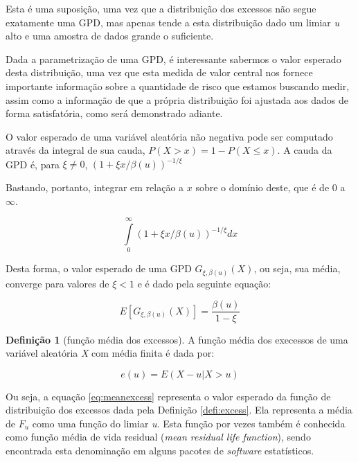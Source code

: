 \documentclass[review]{elsarticle}
\theoremstyle{definition}
\newtheorem{defi}[teor]{Definição}
\begin{document}
Esta é uma suposição, uma vez que a distribuição dos excessos não segue exatamente uma GPD, mas apenas tende a esta distribuição dado um limiar \emph{u} alto e uma amostra de dados grande o suficiente.

Dada a parametrização de uma GPD, é interessante sabermos o valor esperado desta distribuição, uma vez que esta medida de valor central nos fornece importante informação sobre a quantidade de risco que estamos buscando medir, assim como a informação de que a própria distribuição foi ajustada aos dados de forma satisfatória, como será demonstrado adiante.

O valor esperado de uma variável aleatória não negativa pode ser computado através da integral de sua cauda, $P(X>x) = 1-P(X \leq x)$. A cauda da GPD é, para $\xi \neq 0$, $\left(1+\xi x / \beta(u) \right)^{-1/ \xi}$

Bastando, portanto, integrar em relação a $x$ sobre o domínio deste, que é de $0$ a $\infty$.

\begin{equation*}
\displaystyle\int\limits_{0}^{\infty} \left(1+ \xi x /\beta(u) \right)^{-1/\xi} dx
\end{equation*}

Desta forma, o valor esperado de uma GPD $G_{\xi,\beta(u)} (X)$, ou seja, sua média, converge para valores de $\xi<1$ e é dado pela seguinte equação:

\begin{equation}
\label{eq:meanGPD}
E\left[G_{\xi,\beta(u)} (X) \right]=\frac{\beta(u)}{1-\xi}
\end{equation}

\begin{defi}[função média dos excessos]
	\label{defi:meanexcess}
	A função média dos execessos de uma variável aleatória \emph{X} com média finita é dada por:
\end{defi}

\begin{equation}
\label{eq:meanexcess}
e(u)=E\left(X-u | X > u\right)
\end{equation}

Ou seja, a equação \eqref{eq:meanexcess} representa o valor esperado da função de distribuição dos excessos dada pela Definição \ref{defi:excess}. Ela representa a média de $F_u$ como uma função do limiar \emph{u}. Esta função por vezes também é conhecida como função média de vida residual (\emph{mean residual life function}), sendo encontrada esta denominação em alguns pacotes de \emph{software} estatísticos.
\end{document}
